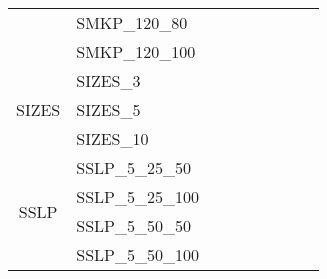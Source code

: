 \begin{table}[]
{\begin{tabular}{|c|l|l|l|l|l|l|l|l|}
			& SMKP\_120\_80                 &                                    &                                  &                            &                          &                                         &                                 &                                \\
			& SMKP\_120\_100                &                                    &                                  &                            &                          &                                         &                                 &                                \\ \hline
			\multirow{3}{*}{SIZES}   & SIZES\_3                      &                                    &                                  &                            &                          &                                         &                                 &                                \\
			& SIZES\_5                      &                                    &                                  &                            &                          &                                         &                                 &                                \\
			& SIZES\_10                     &                                    &                                  &                            &                          &                                         &                                 &                                \\ \hline
			\multirow{8}{*}{SSLP}    & SSLP\_5\_25\_50               &                                    &                                  &                            &                          &                                         &                                 &                                \\
			& SSLP\_5\_25\_100              &                                    &                                  &                            &                          &                                         &                                 &                                \\
			& SSLP\_5\_50\_50               &                                    &                                  &                            &                          &                                         &                                 &                                \\
			& SSLP\_5\_50\_100              &                                    &                                  &                            &                          &                                         &                                 &                                \\

\end{tabular}}
\end{table}
